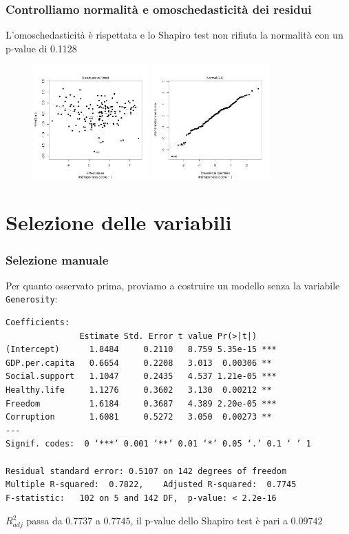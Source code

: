 \documentclass{beamer}
\begin{document}
\begin{frame}
    \frametitle{Controlliamo normalità e omoschedasticità dei residui}
    L'omoschedasticità è rispettata e lo Shapiro test non rifiuta la normalità con un p-value di 0.1128
    \begin{figure}
       \includegraphics[width=0.4\textwidth]{Awhic2}
       \hfill
       \includegraphics[width=0.4\textwidth]{Bwhic3}
    \end{figure}
\end{frame}


\section{Selezione delle variabili}  

\begin{frame}[fragile]
    \frametitle{Selezione manuale}
    Per quanto osservato prima, proviamo a costruire un modello senza la variabile \texttt{Generosity}:

    \tiny
    \begin{verbatim}
Coefficients:
               Estimate Std. Error t value Pr(>|t|)    
(Intercept)      1.8484     0.2110   8.759 5.35e-15 ***
GDP.per.capita   0.6654     0.2208   3.013  0.00306 ** 
Social.support   1.1047     0.2435   4.537 1.21e-05 ***
Healthy.life     1.1276     0.3602   3.130  0.00212 ** 
Freedom          1.6184     0.3687   4.389 2.20e-05 ***
Corruption       1.6081     0.5272   3.050  0.00273 ** 
---
Signif. codes:  0 ‘***’ 0.001 ‘**’ 0.01 ‘*’ 0.05 ‘.’ 0.1 ‘ ’ 1

Residual standard error: 0.5107 on 142 degrees of freedom
Multiple R-squared:  0.7822,    Adjusted R-squared:  0.7745 
F-statistic:   102 on 5 and 142 DF,  p-value: < 2.2e-16
    \end{verbatim}

    \normalsize 
    $R^2_{adj}$ passa da $0.7737$ a $0.7745$, il p-value dello Shapiro test è pari a $0.09742$ 
\end{frame}
\end{document}
